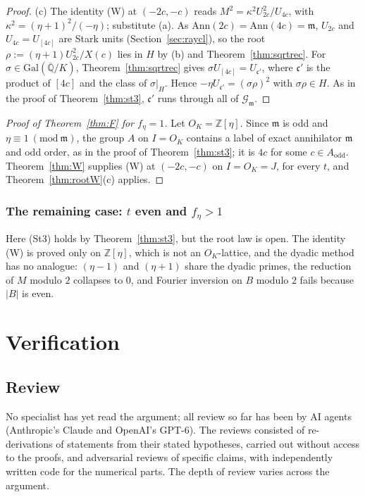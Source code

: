 \documentclass[11pt]{amsart}
\numberwithin{equation}{section}
\theoremstyle{plain}
\theoremstyle{definition}
\theoremstyle{remark}
\begin{document}
\begin{proof}
(c) The identity (W) at \((-2c,-c)\) reads \(M^2=\kappa^2U_{2c}^2/U_{4c}\), with \(\kappa^2=(\eta+1)^2/(-\eta)\); substitute (a). As \(\mathrm{Ann}(2c)=\mathrm{Ann}(4c)=\mathfrak m\), \(U_{2c}\) and \(U_{4c}=U_{[4c]}\) are Stark units (Section~\ref{sec:raycl}), so the root \(\rho:=(\eta+1)U_{2c}^2/X(c)\) lies in \(H\) by (b) and Theorem~\ref{thm:sqrtrec}. For \(\sigma\in\mathrm{Gal}(\overline{\mathbb Q}/K)\), Theorem~\ref{thm:sqrtrec} gives \(\sigma U_{[4c]}=U_{\mathfrak c'}\), where \(\mathfrak c'\) is the product of \([4c]\) and the class of \(\sigma|_H\). Hence \(-\eta U_{\mathfrak c'}=(\sigma\rho)^2\) with \(\sigma\rho\in H\). As in the proof of Theorem~\ref{thm:st3}, \(\mathfrak c'\) runs through all of \(\mathcal G_{\mathfrak m}\).
\end{proof}

\begin{proof}[Proof of Theorem~\ref{thm:F} for \(f_\eta=1\)]
Let \(O_K=\mathbb Z[\eta]\). Since \(\mathfrak m\) is odd and \(\eta\equiv1\ (\mathrm{mod}\ \mathfrak m)\), the group \(A\) on \(I=O_K\) contains a label of exact annihilator \(\mathfrak m\) and odd order, as in the proof of Theorem~\ref{thm:st3}; it is \(4c\) for some \(c\in A_{\mathrm{odd}}\). Theorem~\ref{thm:W} supplies (W) at \((-2c,-c)\) on \(I=O_K=J\), for every \(t\), and Theorem~\ref{thm:rootW}(c) applies.
\end{proof}

\subsubsection*{The remaining case: \(t\) even and \(f_\eta>1\)}

Here (St3) holds by Theorem~\ref{thm:st3}, but the root law is open. The identity (W) is proved only on \(\mathbb Z[\eta]\), which is not an \(O_K\)-lattice, and the dyadic method has no analogue: \((\eta-1)\) and \((\eta+1)\) share the dyadic primes, the reduction of \(M\) modulo \(2\) collapses to \(0\), and Fourier inversion on \(B\) modulo \(2\) fails because \(|B|\) is even.

\section{Verification}\label{sec:verif}

\subsection*{Review}
No specialist has yet read the argument; all review so far has been by AI agents (Anthropic's Claude and OpenAI's GPT-6). The reviews consisted of re-derivations of statements from their stated hypotheses, carried out without access to the proofs, and adversarial reviews of specific claims, with independently written code for the numerical parts. The depth of review varies across the argument.
\end{document}
